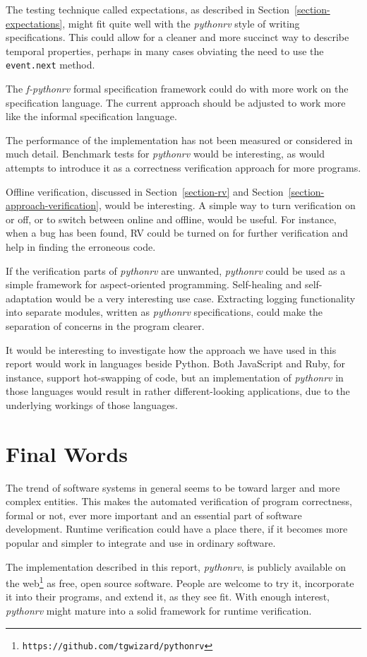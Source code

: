 The testing technique called expectations, as described in
Section~\ref{section-expectations}, might fit quite well with the
\textit{pythonrv} style of writing specifications. This could allow for a
cleaner and more succinct way to describe temporal properties, perhaps in many
cases obviating the need to use the \texttt{event.next} method.

The \textit{f-pythonrv} formal specification framework could do with more
work on the specification language. The current approach should be adjusted to
work more like the informal specification language.

The performance of the implementation has not been measured or considered in
much detail. Benchmark tests for \textit{pythonrv} would be interesting, as
would attempts to introduce it as a correctness verification approach for more
programs.

Offline verification, discussed in Section~\ref{section-rv} and
Section~\ref{section-approach-verification}, would be interesting. A simple way
to turn verification on or off, or to switch between online and offline, would
be useful. For instance, when a bug has been found, RV could be turned on for
further verification and help in finding the erroneous code.

If the verification parts of \textit{pythonrv} are unwanted, \textit{pythonrv}
could be used as a simple framework for aspect-oriented programming.
Self-healing and self-adaptation would be a very interesting use case. Extracting
logging functionality into separate modules, written as \textit{pythonrv}
specifications, could make the separation of concerns in the program clearer.

It would be interesting to investigate how the approach we have used in this
report would work in languages beside Python. Both JavaScript and Ruby, for
instance, support hot-swapping of code, but an implementation of
\textit{pythonrv} in those languages would result in rather different-looking
applications, due to the underlying workings of those languages.


\section{Final Words}

The trend of software systems in general seems to be toward larger and more
complex entities. This makes the automated verification of program
correctness, formal or not, ever more important and an essential part of
software development. Runtime verification could have a place there, if it
becomes more popular and simpler to integrate and use in ordinary software.

The implementation described in this report, \textit{pythonrv}, is publicly
available on the web\footnote{\texttt{https://github.com/tgwizard/pythonrv}} as
free, open source software. People are welcome to try it, incorporate it into
their programs, and extend it, as they see fit. With enough interest,
\textit{pythonrv} might mature into a solid framework for runtime verification.

